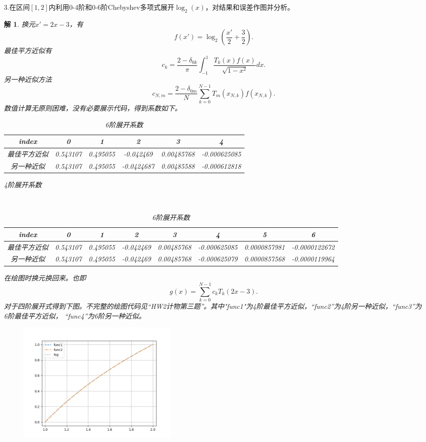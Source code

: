 \documentclass[10pt]{ctexart}
\newtheorem*{solution}{解}
\begin{document}
3.在区间$[1,2]$内利用0-4阶和0-6阶Chebyshev多项式展开$\log_2(x)$，对结果和误差作图并分析。
\begin{solution}
    换元$x'=2x-3$，有
    $$f(x')=\log_2\left(\frac{x'}{2}+\frac{3}{2}\right).$$
    最佳平方近似有
    $$c_k=\frac{2-\delta_{0k}}{\pi}\int_{-1}^{1}\frac{T_k(x)f(x)}{\sqrt{1-x^2}}dx.$$
    另一种近似方法
    $$c_{N,m}=\frac{2-\delta_{0m}}{N}\sum\limits_{k=0}^{N-1}T_m(x_{N,k})f(x_{N,k}).$$
    数值计算无原则困难，没有必要展示代码，得到系数如下。
    \begin{table}[H]
        \centering
        \begin{tabular}{cccccc}
            \toprule
            index & 0 & 1 & 2 & 3 & 4\\
            \midrule
            最佳平方近似 & 0.543107 & 0.495055 & -0.042469 & 0.00485768 & -0.000625085\\
            另一种近似 & 0.543107 & 0.495055 & -0.0424687 & 0.00485588 & -0.000612818\\
            \bottomrule
        \end{tabular}
        \caption{4阶展开系数}
        \ \\
        \begin{tabular}{cccccccc}
        \toprule
        index & 0 & 1 & 2 & 3 & 4 & 5 & 6\\
        \midrule
        最佳平方近似 & 0.543107 & 0.495055 & -0.042469 & 0.00485768 & -0.000625085 & 0.0000857981 & -0.0000122672\\
        另一种近似 & 0.543107 & 0.495055 & -0.042469 &0.00485768 &-0.000625079 &0.0000857568 &-0.0000119964\\
        \bottomrule
        \end{tabular}
        \caption{6阶展开系数}
    \end{table}
    在绘图时换元换回来。也即
    $$g(x)=\sum\limits_{k=0}^{N-1}c_kT_{k}(2x-3).$$
    对于四阶展开式得到下图。不完整的绘图代码见“HW2计物第三题”。其中"func1"为4阶最佳平方近似，“func2”为4阶另一种近似，“func3”为6阶最佳平方近似，
    “func4”为6阶另一种近似。
    \begin{figure}[H]
        \centering
        \begin{minipage}{0.45\linewidth}
            \centering
            \includegraphics[width=8cm]{4.png}

\end{minipage}
\end{figure}
\end{solution}
\end{document}

